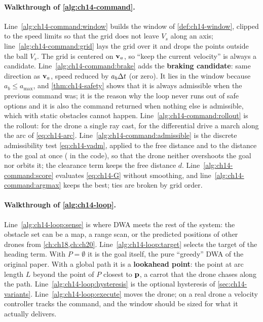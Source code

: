 \paragraph{Walkthrough of \cref{alg:ch14-command}.}
Line~\ref{alg:ch14-command:window} builds the window of
\cref{def:ch14-window}, clipped to the speed limits so that the grid does
not leave $V_s$ along an axis; line~\ref{alg:ch14-command:grid} lays the
grid over it and drops the points outside the ball $V_s$. The grid is
centered on $\mathbf{v}_a$, so ``keep the current velocity'' is always a candidate.
Line~\ref{alg:ch14-command:brake} adds the \textbf{braking
candidate}: same
direction as $\mathbf{v}_a$, speed reduced by $a_b\Delta t$ (or zero). It lies in the
window because $a_b \le a_{\max}$, and \cref{thm:ch14-safety} shows that it
is always admissible when the previous command was; it is the reason why the
loop never runs out of safe options and it is also the command returned when
nothing else is admissible, which with static obstacles cannot happen.
Line~\ref{alg:ch14-command:rollout} is the rollout: for the drone a single
ray cast, for the differential drive a march along the arc of
\cref{eq:ch14-arc}. Line~\ref{alg:ch14-command:admissible} is the discrete admissibility test
\cref{eq:ch14-vadm}, applied to the free distance and to the distance to the
goal at once ( in the code), so that the drone neither
overshoots the goal nor orbits it; the clearance term keeps the free distance
$d$. Line~\ref{alg:ch14-command:score}
evaluates \cref{eq:ch14-G} without smoothing, and
line~\ref{alg:ch14-command:argmax} keeps the best; ties are broken by grid
order.

\paragraph{Walkthrough of \cref{alg:ch14-loop}.}
Line~\ref{alg:ch14-loop:sense} is where DWA meets the rest of the system:
the obstacle set can be a map, a range scan, or the predicted positions of
other drones from \cref{ch:ch18,ch:ch20}. Line~\ref{alg:ch14-loop:target}
selects the target of the heading term. With $P = \emptyset$ it is the goal
itself, the pure ``greedy'' DWA of the original paper. With a global path it
is a \textbf{lookahead point}: the point at arc length
$L$ beyond the point of $P$ closest to $\mathbf{p}$, a carrot that the drone
chases along the path. Line~\ref{alg:ch14-loop:hysteresis} is the optional
hysteresis of \cref{sec:ch14-variants}. Line~\ref{alg:ch14-loop:execute} moves the drone; on a real drone a velocity
controller tracks the command, and the window should be sized for what it
actually delivers.

